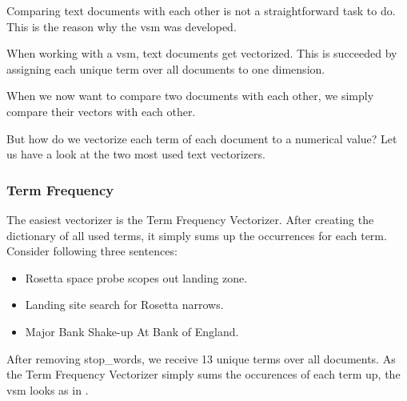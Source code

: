 Comparing text documents with each other is not a straightforward task to do.
This is the reason why the \gls{vsm} was developed.

When working with a \gls{vsm}, text documents get vectorized.
This is succeeded by assigning each unique term over all documents to one dimension.

When we now want to compare two documents with each other,
we simply compare their vectors with each other.

But how do we vectorize each term of each document to a numerical value?
Let us have a look at the two most used text vectorizers.

\subsubsection{Term Frequency}
\label{subsubsec:3_term_frequency}

The easiest vectorizer is the Term Frequency Vectorizer.
After creating the dictionary of all used terms, it simply sums up the occurrences for each term.
Consider following three sentences:

\begin{itemize}
    \item Rosetta space probe scopes out landing zone.
    \item Landing site search for Rosetta narrows.
    \item Major Bank Shake-up At Bank of England.
\end{itemize}

After removing \Glspl{stop_word}, we receive 13 unique terms over all documents.
As the Term Frequency Vectorizer simply sums the occurences of each term up,
the \Gls{vsm} looks as in .

\begin{table}[h]
    \centering
    \caption{Term Frequency \Gls{vsm}.}
    \label{tab:tf_vsm}
\end{table}

